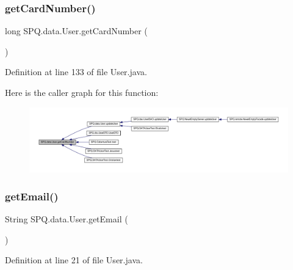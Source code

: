 \subsubsection{\texorpdfstring{get\+Card\+Number()}{getCardNumber()}}
{\footnotesize\ttfamily long S\+P\+Q.\+data.\+User.\+get\+Card\+Number (\begin{DoxyParamCaption}{ }\end{DoxyParamCaption})}



Definition at line 133 of file User.\+java.

Here is the caller graph for this function\+:
\nopagebreak
\begin{figure}[H]
\begin{center}
\leavevmode
\includegraphics[width=350pt]{class_s_p_q_1_1data_1_1_user_ab847d5c61fe4980ae2a15a537b22939b_icgraph}
\end{center}
\end{figure}
\mbox{\label{class_s_p_q_1_1data_1_1_user_a4f3ae0062ee7529314a5b791707ff4b4}} 
\subsubsection{\texorpdfstring{get\+Email()}{getEmail()}\hspace{0.1cm}{\footnotesize\ttfamily [1/4]}}
{\footnotesize\ttfamily String S\+P\+Q.\+data.\+User.\+get\+Email (\begin{DoxyParamCaption}{ }\end{DoxyParamCaption})}



Definition at line 21 of file User.\+java.

\mbox{\label{class_s_p_q_1_1data_1_1_user_a4f3ae0062ee7529314a5b791707ff4b4}} 

